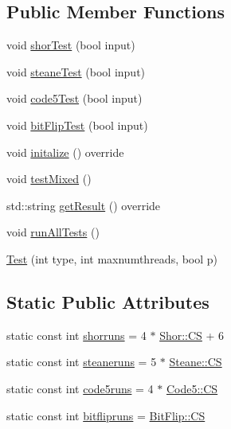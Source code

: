\subsection*{Public Member Functions}
\begin{DoxyCompactItemize}
\item 
void \hyperlink{class_test_aac2e651b089febf2cd5ab1b5d2874c5a}{shor\+Test} (bool input)
\item 
void \hyperlink{class_test_a9bac2c6bc99fbb7f54b79712006956c0}{steane\+Test} (bool input)
\item 
void \hyperlink{class_test_a784d32490d6aa0bf8909d6a1cad5ee33}{code5\+Test} (bool input)
\item 
void \hyperlink{class_test_a89dd7059b847c8429636007515cd42ac}{bit\+Flip\+Test} (bool input)
\item 
void \hyperlink{class_test_a6baf4b2ddf84f198e156bf78c97b865b}{initalize} () override
\item 
void \hyperlink{class_test_afd06ee055f93c52fca29ffd2266b5564}{test\+Mixed} ()
\item 
std\+::string \hyperlink{class_test_ae53178c2e482ed3a869c742387521a60}{get\+Result} () override
\item 
void \hyperlink{class_test_a2616b0b705d644091904f3de58eb46bb}{run\+All\+Tests} ()
\item 
\hyperlink{class_test_a0e256b35537c2b0c4f715f081a368e7c}{Test} (int type, int maxnumthreads, bool p)
\end{DoxyCompactItemize}
\subsection*{Static Public Attributes}
\begin{DoxyCompactItemize}
\item 
static const int \hyperlink{class_test_af926faddaa7288d10542e78bc1be29f6}{shorruns} = 4 $\ast$ \hyperlink{class_shor_a5c2bb5ad73004577f8781a001eda8b8f}{Shor\+::\+CS} + 6
\item 
static const int \hyperlink{class_test_a1f5e5c6be1ad2c4459ad702c254c72a1}{steaneruns} = 5 $\ast$ \hyperlink{class_steane_a3b81ad6daffc03833cea9c333f2cd927}{Steane\+::\+CS}
\item 
static const int \hyperlink{class_test_af99add0cf16991621c26ea17bd38d41d}{code5runs} = 4 $\ast$ \hyperlink{class_code5_ac252f1c41568341657456564d0417630}{Code5\+::\+CS}
\item 
static const int \hyperlink{class_test_af4a50e78867431da5e5b8cf5110645aa}{bitflipruns} = \hyperlink{class_bit_flip_a8f5442dd93f87ea35fcb0b0bb423bbf0}{Bit\+Flip\+::\+CS}
\end{DoxyCompactItemize}
